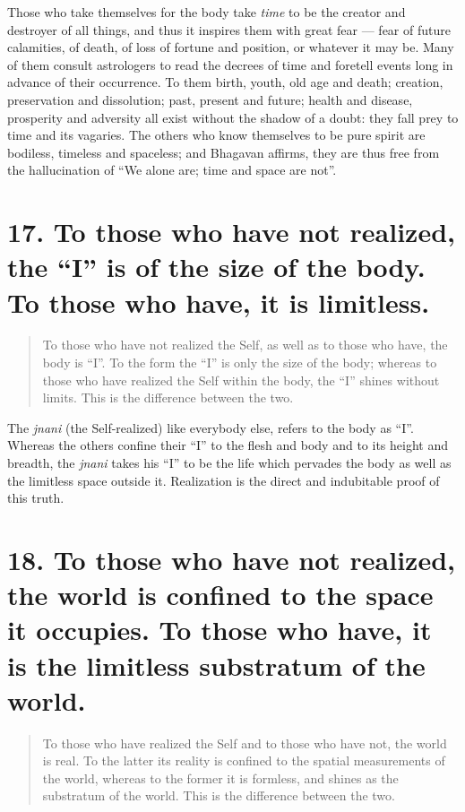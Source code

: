 \documentclass[12pt]{report}
\begin{document}
Those who take themselves for the body take \emph{time} to be the
creator and destroyer of all things, and thus it inspires them with
great fear --- fear of future calamities, of death, of loss of fortune
and position, or whatever it may be. Many of them consult astrologers
to read the decrees of time and foretell events long in advance of
their occurrence. To them birth, youth, old age and death; creation,
preservation and dissolution; past, present and future; health and
disease, prosperity and adversity all exist without the shadow of a
doubt: they fall prey to time and its vagaries. The others who know
themselves to be pure spirit are bodiless, timeless and spaceless; and
Bhagavan affirms, they are thus free from the hallucination of ``We
alone are; time and space are not''.

\section{17. To those who have not realized, the ``I'' is of the size
  of the body. To those who have, it is limitless.}

\begin{quote}
  To those who have not realized the Self, as well as to those who
  have, the body is ``I''. To the form the ``I'' is only the size of
  the body; whereas to those who have realized the Self within the
  body, the ``I'' shines without limits. This is the difference
  between the two.
\end{quote}


The \emph{jnani} (the Self-realized) like everybody else, refers to
the body as ``I''. Whereas the others confine their ``I'' to the flesh
and body and to its height and breadth, the \emph{jnani} takes his
``I'' to be the life which pervades the body as well as the limitless
space outside it. Realization is the direct and indubitable proof of
this truth. 

\section{18. To those who have not realized, the world is confined to
  the space it occupies. To those who have, it is the limitless
  substratum of the world.}

\begin{quote}
  To those who have realized the Self and to those who have not, the
  world is real. To the latter its reality is confined to the spatial
  measurements of the world, whereas to the former it is formless, and
  shines as the substratum of the world. This is the difference
  between the two.
\end{quote}
\end{document}
